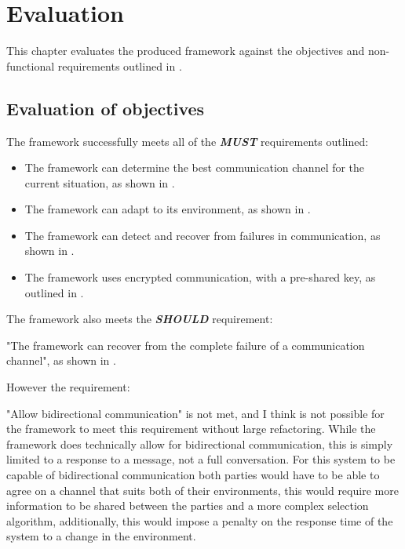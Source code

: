 \chapter{Evaluation}

This chapter evaluates the produced framework against the objectives and non-functional requirements outlined in .

\section{Evaluation of objectives}

The framework successfully meets all of the \textit{\textbf{MUST}} requirements outlined:

\begin{itemize}
    \item The framework can determine the best communication channel for the current situation, as shown in .
    \item The framework can adapt to its environment, as shown in .
    \item The framework can detect and recover from failures in communication, as shown in .
    \item The framework uses encrypted communication, with a pre-shared key, as outlined in .
\end{itemize}

The framework also meets the \textit{\textbf{SHOULD}} requirement:

"The framework can recover from the complete failure of a communication channel", as shown in .

However the requirement:

"Allow bidirectional communication" is not met, and I think is not possible for the framework to meet this requirement without large refactoring. While the framework does technically allow for bidirectional communication, this is simply limited to a response to a message, not a full conversation. For this system to be capable of bidirectional communication both parties would have to be able to agree on a channel that suits both of their environments, this would require more information to be shared between the parties and a more complex selection algorithm, additionally, this would impose a penalty on the response time of the system to a change in the environment.

